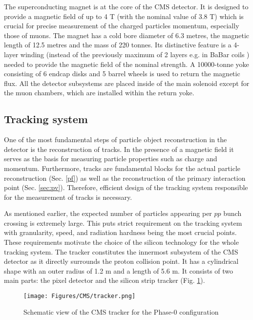 The superconducting magnet is at the core of the CMS detector. It is designed to provide a magnetic field of up to 4 T (with the nominal value of 3.8 T) which is crucial for precise measurement of the charged particles momentum, especially those of muons. The magnet has a cold bore diameter of 6.3 metres, the magnetic length of 12.5 metres and the mass of 220 tonnes. Its distinctive feature is a 4-layer winding (instead of the previously maximum of 2 layers e.g. in BaBar coils \cite{BaBar:2001yhh}) needed to provide the magnetic field of the nominal strength. A 10000-tonne yoke consisting of 6 endcap disks and 5 barrel wheels is used to return the magnetic flux. All the detector subsystems are placed inside of the main solenoid except for the muon chambers, which are installed within the return yoke.

\subsection{Tracking system}\label{sec:tracker}
One of the most fundamental steps of particle object reconstruction in the detector is the reconstruction of tracks. In the presence of a magnetic field it serves as the basis for measuring particle properties such as charge and momentum. Furthermore, tracks are fundamental blocks for the actual particle reconstruction (Sec. \ref{pf}) as well as the reconstruction of the primary interaction point (Sec. \ref{sec:pv}). Therefore, efficient design of the tracking system responsible for the measurement of tracks is necessary.

As mentioned earlier, the expected number of particles appearing per $pp$ bunch crossing is extremely large. This puts strict requirement on the tracking system with granularity, speed, and radiation hardness being the most crucial points. These requirements motivate the choice of the silicon technology for the whole tracking system. The tracker constitutes the innermost subsystem of the CMS detector as it directly surrounds the proton collision point. It has a cylindrical shape with an outer radius of 1.2 m and a length of 5.6 m. It consists of two main parts: the pixel detector and the silicon strip tracker (Fig. \ref{fig:tracker}). 

\begin{figure}[h!]
    \centering
    \texttt{[image: Figures/CMS/tracker.png]}
    \caption{Schematic view of the CMS tracker for the Phase-0 configuration \cite{CMS:2008xjf}}
    \label{fig:tracker}
\end{figure}

